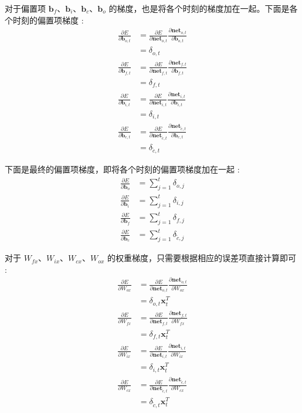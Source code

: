 \documentclass[10.5pt,compsoc]{CjC}
\theoremstyle{mystyle}
\begin{document}
对于偏置项 $\mathbf{b}_{f} 、 \mathbf{b}_{i} 、 \mathbf{b}_{c} 、 \mathbf{b}_{o}$ 的梯度，也是将各个时刻的梯度加在一起。下面是各个时刻的偏置项梯度 :
$$
\begin{aligned}
\frac{\partial E}{\partial \mathbf{b}_{o, t}} &=\frac{\partial E}{\partial \mathbf{n e t}_{o, t}} \frac{\partial \mathbf{n e t}_{o, t}}{\partial \mathbf{b}_{o, t}} \\
&=\delta_{o, t} \\
\frac{\partial E}{\partial \mathbf{b}_{f, t}} &=\frac{\partial E}{\partial \mathbf{n e t}_{f, t}} \frac{\partial \mathbf{n e t}_{f, t}}{\partial \mathbf{b}_{f, t}} \\
&=\delta_{f, t} \\
\frac{\partial E}{\partial \mathbf{b}_{i, t}} &=\frac{\partial E}{\partial \mathbf{n e t}_{i, t}} \frac{\partial \mathbf{n e t}_{i, t}}{\partial \mathbf{b}_{i, t}} \\
&=\delta_{i, t} \\
\frac{\partial E}{\partial \mathbf{b}_{c, t}} &=\frac{\partial E}{\partial \mathbf{n e t}_{\tilde{c}, t}} \frac{\partial \mathbf{n e t}_{\tilde{c}, t}}{\partial \mathbf{b}_{c, t}} \\
&=\delta_{\tilde{c}, t}
\end{aligned}
$$

下面是最终的偏置项梯度，即将各个时刻的偏置项梯度加在一起 :
$$
\begin{aligned}
\frac{\partial E}{\partial \mathbf{b}_{o}} &=\sum_{j=1}^{t} \delta_{o, j} \\
\frac{\partial E}{\partial \mathbf{b}_{i}} &=\sum_{j=1}^{t} \delta_{i, j} \\
\frac{\partial E}{\partial \mathbf{b}_{f}} &=\sum_{j=1}^{t} \delta_{f, j} \\
\frac{\partial E}{\partial \mathbf{b}_{c}} &=\sum_{j=1}^{t} \delta_{\tilde{c}, j}
\end{aligned}
$$

对于 $W_{f x} 、 W_{i x} 、 W_{c x} 、 W_{o x}$ 的权重梯度，只需要根据相应的误差项直接计算即可 :
$$
\begin{aligned}
\frac{\partial E}{\partial W_{o x}} &=\frac{\partial E}{\partial \mathbf{n e t}_{o, t}} \frac{\partial \mathbf{n e t}_{o, t}}{\partial W_{o x}} \\
&=\delta_{o, t} \mathbf{x}_{t}^{T} \\
\frac{\partial E}{\partial W_{f x}} &=\frac{\partial E}{\partial \mathbf{n e t}_{f, t}} \frac{\partial \mathbf{n e t}_{f, t}}{\partial W_{f x}} \\
&=\delta_{f, t} \mathbf{x}_{t}^{T} \\
\frac{\partial E}{\partial W_{i x}} &=\frac{\partial E}{\partial \mathbf{n e t}_{i, t}} \frac{\partial \mathbf{n e t}_{i, t}}{\partial W_{i x}} \\
&=\delta_{i, t} \mathbf{x}_{t}^{T} \\
\frac{\partial E}{\partial W_{c x}} &=\frac{\partial E}{\partial \mathbf{n e t}_{\tilde{c}, t}} \frac{\partial \mathbf{n e t}_{\tilde{c}, t}}{\partial W_{c x}} \\
&=\delta_{\tilde{c}, t} \mathbf{x}_{t}^{T}
\end{aligned}
$$
\end{document}
